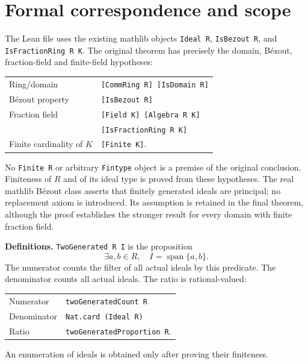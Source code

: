 \documentclass[11pt]{article}
\begin{document}
\section*{Formal correspondence and scope}
The Lean file uses the existing mathlib objects \texttt{Ideal R},
\texttt{IsBezout R}, and \texttt{IsFractionRing R K}.
The original theorem has precisely the domain, B\'ezout, fraction-field and
finite-field hypotheses:
\begin{center}
\small
\begin{tabular}{ll}
Ring/domain & \texttt{[CommRing R] [IsDomain R]}\\
B\'ezout property & \texttt{[IsBezout R]}\\
Fraction field & \texttt{[Field K] [Algebra R K]}\\
 & \texttt{[IsFractionRing R K]}\\
Finite cardinality of $K$ & \texttt{[Finite K]}.
\end{tabular}
\end{center}
No \texttt{Finite R} or arbitrary \texttt{Fintype} object is a premise of
the original conclusion. Finiteness of $R$ and of its ideal type is proved
from these hypotheses. The real mathlib B\'ezout class asserts that finitely
generated ideals are principal; no replacement axiom is introduced. Its
assumption is retained in the final theorem, although the proof establishes
the stronger result for every domain with finite fraction field.

\medskip
\noindent\textbf{Definitions.}
\texttt{TwoGenerated R I} is the proposition
\[
 \exists a,b\in R,\quad I=\operatorname{span}\{a,b\}.
\]
The numerator counts the filter of all actual ideals by this predicate.
The denominator counts all actual ideals. The ratio is rational-valued:
\begin{center}
\small
\begin{tabular}{@{}ll@{}}
Numerator & \texttt{twoGeneratedCount R}\\
Denominator & \texttt{Nat.card (Ideal R)}\\
Ratio & \texttt{twoGeneratedProportion R}.
\end{tabular}
\end{center}
An enumeration of ideals is obtained only after proving their finiteness.
\end{document}
